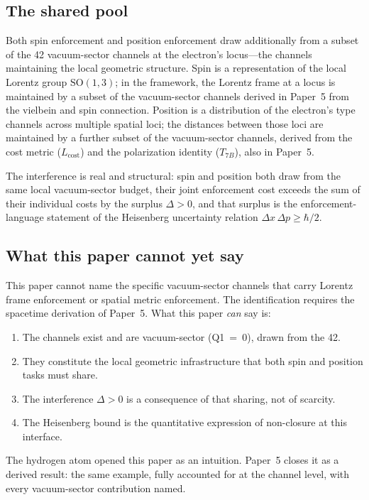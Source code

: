 \documentclass[11pt]{article}
\begin{document}
\subsection*{The shared pool}

Both spin enforcement and position enforcement draw additionally from a
subset of the 42 vacuum-sector channels at the electron's
locus---the channels maintaining the local geometric structure.  Spin is
a representation of the local Lorentz group $\mathrm{SO}(1,3)$; in the
framework, the Lorentz frame at a locus is maintained by a subset of the
vacuum-sector channels derived in Paper~5 from the vielbein and spin
connection.  Position is a distribution of the electron's type channels
across multiple spatial loci; the distances between those loci are
maintained by a further subset of the vacuum-sector channels, derived
from the cost metric ($L_{\mathrm{cost}}$) and the polarization identity
($T_{7B}$), also in Paper~5.

The interference is real and structural: spin and position both draw from
the same local vacuum-sector budget, their joint enforcement cost exceeds
the sum of their individual costs by the surplus $\Delta > 0$, and that
surplus is the enforcement-language statement of the Heisenberg
uncertainty relation $\Delta x\,\Delta p \ge \hbar/2$.

\subsection*{What this paper cannot yet say}

This paper cannot name the specific vacuum-sector channels that carry
Lorentz frame enforcement or spatial metric enforcement.  The
identification requires the spacetime derivation of Paper~5.  What this
paper \emph{can} say is:

\begin{enumerate}
\item The channels exist and are vacuum-sector (Q1~=~0), drawn from the
42.
\item They constitute the local geometric infrastructure that both spin
and position tasks must share.
\item The interference $\Delta > 0$ is a consequence of that sharing,
not of scarcity.
\item The Heisenberg bound is the quantitative expression of
non-closure at this interface.
\end{enumerate}

The hydrogen atom opened this paper as an intuition.  Paper~5 closes it
as a derived result: the same example, fully accounted for at the channel
level, with every vacuum-sector contribution named.
\end{document}
